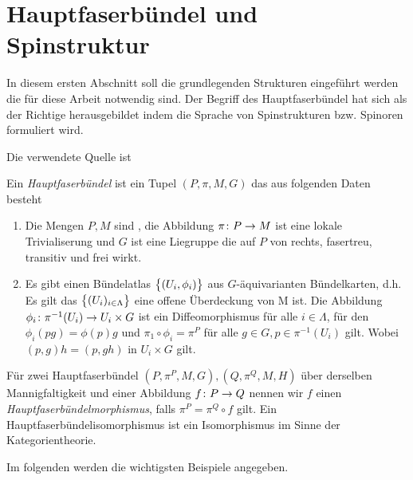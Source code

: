 

\section{Hauptfaserbündel und Spinstruktur}

In diesem ersten Abschnitt soll die grundlegenden Strukturen eingeführt werden die für diese Arbeit notwendig sind. Der Begriff des Hauptfaserbündel hat sich als der Richtige herausgebildet indem die Sprache von Spinstrukturen bzw. Spinoren formuliert wird.

Die verwendete Quelle ist \cite{baum09}

\begin{Def}[Hauptfaserbündel]
	Ein \textit{Hauptfaserbündel} ist ein Tupel $(P,\pi,M,G)$ das aus folgenden Daten besteht
	\begin{enumerate}[\textbullet]
		\item Die Mengen $P,M$ sind \mfgen, die Abbildung $ \pi \colon P \rightarrow M $ ist eine lokale Trivialiserung und $G$ ist eine Liegruppe
		die auf $P$ von rechts, fasertreu, transitiv und frei wirkt. 
		\item Es gibt einen Bündelatlas $\bigl\{ (U_i,\phi_i) \bigr\}$ aus $G$-äquivarianten Bündelkarten, d.h.
		Es gilt das $\bigl\{ (U_i)_{i \in \Lambda} \bigr\}$ eine offene
		Überdeckung von M ist. Die Abbildung $ \phi_i \colon \pi^{-1}(U_i) \rightarrow U_i\times G $ ist ein
		Diffeomorphismus für alle $i \in \Lambda $, für den $ \phi_i(pg) = \phi(p) g  $ und $ \pi_1 \circ \phi_i = \pi^P $ für alle $ g \in G, p \in \pi^{-1}(U_i) $ gilt. Wobei $ (p,g) h = (p,gh) $ in 
		$ U_i\times G $ gilt. 
	\end{enumerate}		
	Für zwei Hauptfaserbündel $(P,\pi^P,M,G),(Q,\pi^Q,M,H)$ 
	über derselben Mannigfaltigkeit und einer Abbildung $f \colon P \rightarrow Q$ nennen wir $f$ einen \textit{Hauptfaserbündelmorphismus}, falls $ \pi^P=\pi^Q \circ f $ gilt. Ein Hauptfaserbündelisomorphismus ist
	ein Isomorphismus im Sinne der Kategorientheorie.
\end{Def}

Im folgenden werden die wichtigsten Beispiele angegeben.

